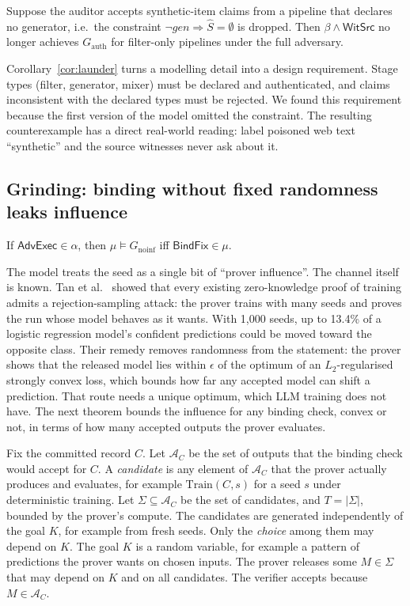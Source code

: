 \begin{corollary}\label{cor:launder}
Suppose the auditor accepts synthetic-item claims from a pipeline that declares no
generator, i.e.\ the constraint $\neg\mathit{gen}\Rightarrow\hat S=\emptyset$ is dropped. Then
$\beta\wedge\textsf{WitSrc}$ no longer achieves $G_{\mathrm{auth}}$ for filter-only
pipelines under the full adversary.
\end{corollary}

Corollary~\ref{cor:launder} turns a modelling detail into a design requirement. Stage
types (filter, generator, mixer) must be declared and authenticated, and claims inconsistent
with the declared types must be rejected. We found this requirement because the first
version of the model omitted the constraint. The resulting counterexample has a direct
real-world reading: label poisoned web text ``synthetic'' and the source witnesses never
ask about it.

\subsection{Grinding: binding without fixed randomness leaks influence}

\begin{theorem}[Influence]\label{thm:noinf}
If $\textsf{AdvExec}\in\alpha$, then $\mu\models G_{\mathrm{noinf}}$ iff
$\textsf{BindFix}\in\mu$.
\end{theorem}

The model treats the seed as a single bit of ``prover influence''. The channel itself is
known. Tan et al.~\cite{tan2025zkpot} showed that every existing zero-knowledge proof of
training admits a rejection-sampling attack: the prover trains with many seeds and proves
the run whose model behaves as it wants. With 1,000 seeds, up to 13.4\% of a logistic
regression model's confident predictions could be moved toward the opposite class. Their remedy
removes randomness from the statement: the prover shows that the released model lies within
$\epsilon$ of the optimum of an $L_2$-regularised strongly convex loss, which bounds how far any
accepted model can shift a prediction. That route needs a unique optimum, which LLM training
does not have. The next theorem bounds the influence for any binding check, convex or not, in
terms of how many accepted outputs the prover evaluates.

Fix the committed record $C$. Let $\mathcal A_C$ be the set of outputs that the binding
check would accept for $C$. A \emph{candidate} is any element of $\mathcal A_C$ that the
prover actually produces and evaluates, for example $\mathrm{Train}(C,s)$ for a seed $s$
under deterministic training. Let $\Sigma\subseteq\mathcal A_C$ be the set of candidates,
and $T=|\Sigma|$, bounded by the prover's compute. The candidates are generated independently
of the goal $K$, for example from fresh seeds. Only the \emph{choice} among them may depend
on $K$. The goal $K$ is a random variable, for example a pattern of
predictions the prover wants on chosen inputs. The prover releases some $M\in\Sigma$ that
may depend on $K$ and on all candidates. The verifier accepts because $M\in\mathcal A_C$.

